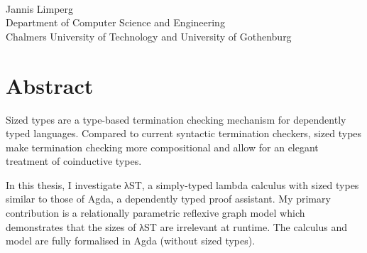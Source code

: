 
\thispagestyle{plain}			%

\begingroup
\setlength{\parindent}{0pt}

\oneLineTitle\\
Jannis Limperg\\
Department of Computer Science and Engineering\\
Chalmers University of Technology and University of Gothenburg

\endgroup

\section*{Abstract}

Sized types are a type-based termination checking mechanism for dependently
typed languages. Compared to current syntactic termination checkers, sized types
make termination checking more compositional and allow for an elegant treatment
of coinductive types.

In this thesis, I investigate λST, a simply-typed lambda calculus with sized
types similar to those of Agda, a dependently typed proof assistant. My primary
contribution is a relationally parametric reflexive graph model which
demonstrates that the sizes of λST are irrelevant at runtime. The calculus and
model are fully formalised in Agda (without sized types).




\newpage				%
\thispagestyle{empty}
\mbox{}